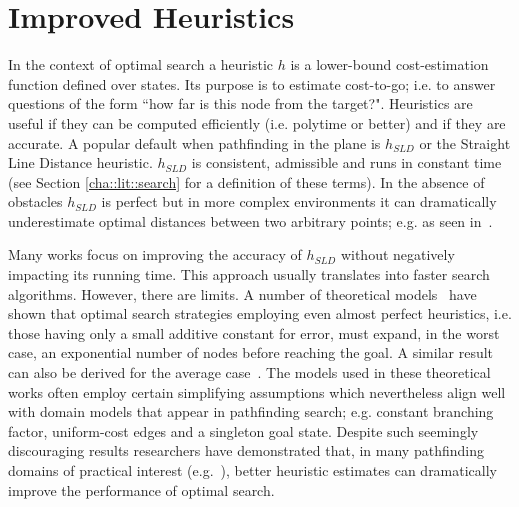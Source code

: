 \section{Improved Heuristics}
\label{cha::lit::heuristics}

%
In the context of optimal search a heuristic $h$ is a lower-bound
cost-estimation function defined over states. Its purpose is to estimate
cost-to-go; i.e. to answer questions of the form ``how far is this node from
the target?".  Heuristics are useful if they can be computed efficiently (i.e.
polytime or better) and if they are accurate.  A popular default when
pathfinding in the plane is $h_{SLD}$ or the Straight Line Distance heuristic.
$h_{SLD}$ is consistent, admissible and runs in constant time (see  Section
\ref{cha::lit::search} for a definition of these terms).  In the absence of
obstacles $h_{SLD}$ is perfect but in more complex environments it can
dramatically underestimate optimal distances between two arbitrary points;
e.g. as seen in~\citep{goldberg05}.

Many works focus on improving the accuracy of $h_{SLD}$ without negatively
impacting its running time. This approach usually translates into faster
search algorithms. However, there are limits.  A number of theoretical
models~\citep{pohl77,helmert08} have shown that optimal search strategies
employing even almost perfect heuristics, i.e. those having only a small
additive constant for error, must expand, in the worst case, an exponential
number of nodes before reaching the goal.  A similar result can also be
derived for the average case~\citep{pearl84}.  The models used in these
theoretical works often employ certain simplifying assumptions which
nevertheless align well with domain models that appear in pathfinding
search; e.g.  constant branching factor, uniform-cost edges and a singleton 
goal state.
Despite such seemingly discouraging results researchers have demonstrated
that, in many pathfinding domains of practical interest
(e.g.~\citep{sturtevant12}), better heuristic estimates can dramatically
improve the performance of optimal search.

